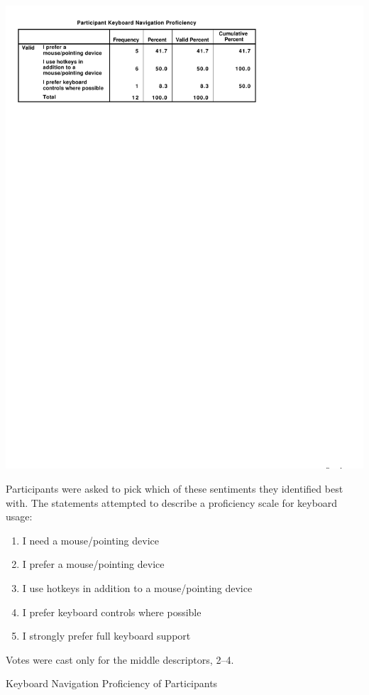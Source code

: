 \documentclass[a4paper, 12pt]{report}
\begin{document}
\begin{table}[ht]
\centerline{\includegraphics{figures/Proficiency.pdf}}
\label{fig:partic_proficiency}
\medskip
\small
Participants were asked to pick which of these sentiments they identified best with. The statements attempted to describe a proficiency scale for keyboard usage:
\begin{enumerate}
\item I need a mouse/pointing device
\item I prefer a mouse/pointing device
\item I use hotkeys in addition to a mouse/pointing device
\item I prefer keyboard controls where possible
\item I strongly prefer full keyboard support
\end{enumerate}
Votes were cast only for the middle descriptors, 2--4.
\caption{Keyboard Navigation Proficiency of Participants}

\end{table}
\end{document}
